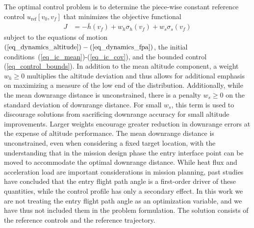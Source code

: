 \documentclass[journal ]{new-aiaa}
\newcommand{\ur}{\ensuremath{u_{\mathrm{ref}}}}
\newcommand{\E}[1]{\mathbb{E}\left[#1\right]}
\newcommand{\V}[1]{\mathbb{V}[#1]}
\begin{document}
The optimal control problem is to determine the piece-wise constant reference control $\ur\left[v_0,v_f\right]$ that minimizes the objective functional
\begin{align}
J &= -\bar{h}(v_f) + w_h\sigma_h(v_f) + w_s\sigma_s(v_f) \label{eq_objective}
\end{align}
subject to the equations of motion $(\ref{eq_dynamics_altitude})-(\ref{eq_dynamics_fpa})$, the initial conditions~(\ref{eq_ic_mean})-(\ref{eq_ic_cov}), and the bounded control (\ref{eq_control_bounds}). 
In addition to the mean altitude component, a weight $w_h\ge0$ multiplies the altitude deviation and thus allows for additional emphasis on maximizing a measure of the low end of the distribution. Additionally, while the mean downrange distance is unconstrained, there is a penalty $w_s\ge0$ on the standard deviation of downrange distance. For small $w_s$, this term is used to discourage solutions from sacrificing downrange accuracy for small altitude improvements. Larger weights encourage greater reduction in downrange errors at the expense of altitude performance. The mean downrange distance is unconstrained, even when considering a fixed target location, with the understanding that in the mission design phase the entry interface point can be moved to accommodate the optimal downrange distance. While heat flux and acceleration load are important considerations in mission planning, past studies have concluded that the entry flight path angle is a first-order driver of these quantities, while the control profile has only a secondary effect. In  this work we are not treating the entry flight path angle as an optimization variable, and we have thus not included them in the problem formulation. 
The solution consists of the reference controls and the reference trajectory.

\end{document}
